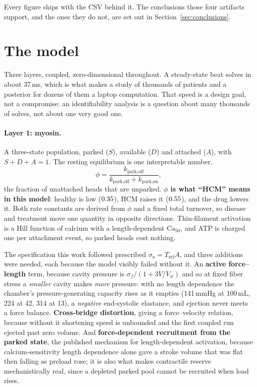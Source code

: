 \documentclass[11pt,a4paper]{article}
\newcommand{\claim}[1]{\textcolor{accent}{\textbf{#1}}}
\begin{document}
\noindent Every figure ships with the CSV behind it. The conclusions those four artifacts
support, and the ones they do not, are set out in Section~\ref{sec:conclusions}.

\section{The model}

Three layers, coupled, zero-dimensional throughout. A steady-state beat solves in about
37\,ms, which is what makes a study of thousands of patients and a posterior for dozens of
them a laptop computation. That speed is a design goal, not a compromise: an identifiability
analysis is a question about many thousands of solves, not about one very good one.

\paragraph{Layer 1: myosin.} A three-state population, parked ($S$), available ($D$) and
attached ($A$), with $S+D+A=1$. The resting equilibrium is one interpretable number,
\[
\phi = \frac{k_\text{park,off}}{k_\text{park,off}+k_\text{park,on}},
\]
the fraction of unattached heads that are unparked. \claim{$\phi$ is what ``HCM'' means in
this model}: healthy is low ($0.35$), HCM raises it ($0.55$), and the drug lowers
it. Both rate constants are derived from $\phi$ and a fixed total turnover, so disease and
treatment move one quantity in opposite directions. Thin-filament activation is a Hill
function of calcium with a length-dependent $\text{Ca}_{50}$, and ATP is charged one per
attachment event, so parked heads cost nothing.

The specification this work followed prescribed $\sigma_a = T_\text{ref} A$, and three
additions were needed, each because the model visibly failed without it. An \textbf{active
force--length} term, because cavity pressure is $\sigma_f/(1+3V/V_w)$ and so at fixed fiber
stress a \emph{smaller} cavity makes \emph{more} pressure: with no length dependence the
chamber's pressure-generating capacity rises as it empties (141\,mmHg at 100\,mL, 224 at 42,
314 at 13), a \emph{negative} end-systolic elastance, and ejection never meets a force
balance. \textbf{Cross-bridge distortion}, giving a force--velocity relation, because without
it shortening speed is unbounded and the first coupled run ejected past zero volume. And
\textbf{force-dependent recruitment from the parked state}, the published mechanism for
length-dependent activation, because calcium-sensitivity length dependence alone gave a
stroke volume that was flat then falling as preload rose; it is also what makes contractile
reserve mechanistically real, since a depleted parked pool cannot be recruited when load
rises.
\end{document}
